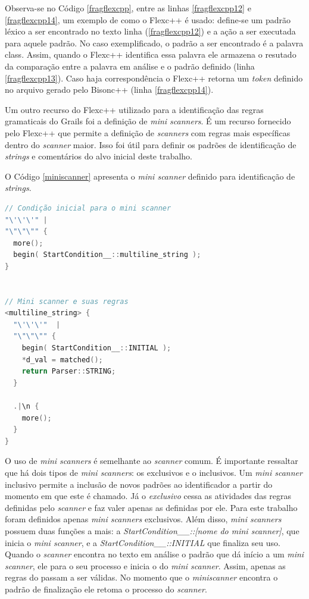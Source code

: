 Observa-se no Código \ref{fragflexcpp}, entre as linhas \ref{fragflexcpp12} e \ref{fragflexcpp14}, um exemplo de como o \textsf{Flexc++} é usado:
define-se um padrão léxico a ser encontrado no texto linha (\ref{fragflexcpp12}) e
a ação a ser executada para aquele padrão. No caso exemplificado, o
padrão a ser encontrado é a palavra \textsf{class}. Assim, quando o Flexc++
identifica essa palavra ele armazena o resutado da comparação entre a palavra em
análise e o padrão definido (linha \ref{fragflexcpp13}). Caso haja correspondência o
Flexc++ retorna um \textit{token} definido no arquivo gerado pelo
\textsf{Bisonc++} (linha \ref{fragflexcpp14}).

Um outro recurso do \textsf{Flexc++} utilizado para a identificação das regras
gramaticais do \textsf{Grails} foi a definição de \textit{mini scanners}. É um
recurso fornecido pelo \textsf{Flexc++} que permite a definição de \textit{scanners}
com regras mais específicas dentro do \textit{scanner} maior. Isso foi útil para
definir os padrões de identificação de \textit{strings} e comentários do alvo inicial deste trabalho.

O Código \ref{miniscanner} apresenta o \textit{mini scanner} definido para
identificação de \textit{strings}.

\begin{lstlisting}[language=C++, label=miniscanner, caption=Implementação do Mini scanner de Strings]
// Condição inicial para o mini scanner
"\'\'\'" |
"\"\"\"" {
  more();
  begin( StartCondition__::multiline_string );
}


// Mini scanner e suas regras
<multiline_string> {
  "\'\'\'"  |
  "\"\"\"" {
    begin( StartCondition__::INITIAL );
    *d_val = matched();
    return Parser::STRING;
  }

  .|\n {
    more();
  }
}
\end{lstlisting}

O uso de \textit{mini scanners} é semelhante ao \textit{scanner} comum. É
importante ressaltar que há dois tipos de \textit{mini scanners}: os exclusivos
e o inclusivos. Um \textit{mini scanner} inclusivo permite a inclusão de novos
padrões ao identificador a partir do momento em que este é chamado. Já o
\textit{exclusivo} cessa as atividades das regras definidas pelo \textit{scanner}
e faz valer apenas as definidas por ele. Para este trabalho foram definidos apenas
\textit{mini scanners} exclusivos. Além disso, \textit{mini scanners} possuem
duas funções a mais: a \textit{StartCondition\_\_::[nome do mini scanner]}, que
inicia o \textit{mini scanner}, e a \textit{StartCondition\_\_::INITIAL} que
finaliza seu uso. Quando o \textit{scanner} encontra no texto em análise o
padrão que dá início a um \textit{mini scanner}, ele para o seu processo e
inicia o do \textit{mini scanner}. Assim, apenas as regras do \miniscanner passam a ser
válidas. No momento que o \textit{miniscanner} encontra o padrão de finalização
ele retoma o processo do \textit{scanner}.

